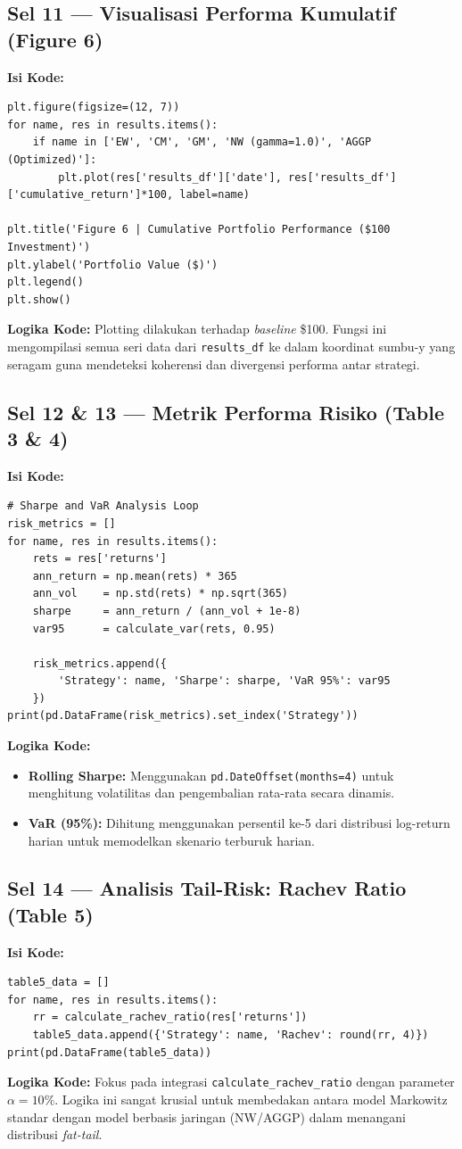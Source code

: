 \documentclass[12pt, a4paper]{article}
\begin{document}
\subsection{Sel 11 — Visualisasi Performa Kumulatif (Figure 6)}
\textbf{Isi Kode:}
\begin{lstlisting}
plt.figure(figsize=(12, 7))
for name, res in results.items():
    if name in ['EW', 'CM', 'GM', 'NW (gamma=1.0)', 'AGGP (Optimized)']:
        plt.plot(res['results_df']['date'], res['results_df']['cumulative_return']*100, label=name)

plt.title('Figure 6 | Cumulative Portfolio Performance ($100 Investment)')
plt.ylabel('Portfolio Value ($)')
plt.legend()
plt.show()
\end{lstlisting}
\textbf{Logika Kode:} Plotting dilakukan terhadap \textit{baseline} \$100. Fungsi ini mengompilasi semua seri data dari \texttt{results\_df} ke dalam koordinat sumbu-y yang seragam guna mendeteksi koherensi dan divergensi performa antar strategi.

\subsection{Sel 12 \& 13 — Metrik Performa Risiko (Table 3 \& 4)}
\textbf{Isi Kode:}
\begin{lstlisting}
# Sharpe and VaR Analysis Loop
risk_metrics = []
for name, res in results.items():
    rets = res['returns']
    ann_return = np.mean(rets) * 365
    ann_vol    = np.std(rets) * np.sqrt(365)
    sharpe     = ann_return / (ann_vol + 1e-8)
    var95      = calculate_var(rets, 0.95)
    
    risk_metrics.append({
        'Strategy': name, 'Sharpe': sharpe, 'VaR 95%': var95
    })
print(pd.DataFrame(risk_metrics).set_index('Strategy'))
\end{lstlisting}
\textbf{Logika Kode:}
\begin{itemize}
    \item \textbf{Rolling Sharpe:} Menggunakan \texttt{pd.DateOffset(months=4)} untuk menghitung volatilitas dan pengembalian rata-rata secara dinamis.
    \item \textbf{VaR (95\%):} Dihitung menggunakan persentil ke-5 dari distribusi log-return harian untuk memodelkan skenario terburuk harian.
\end{itemize}

\subsection{Sel 14 — Analisis Tail-Risk: Rachev Ratio (Table 5)}
\textbf{Isi Kode:}
\begin{lstlisting}
table5_data = []
for name, res in results.items():
    rr = calculate_rachev_ratio(res['returns'])
    table5_data.append({'Strategy': name, 'Rachev': round(rr, 4)})
print(pd.DataFrame(table5_data))
\end{lstlisting}
\textbf{Logika Kode:} Fokus pada integrasi \texttt{calculate\_rachev\_ratio} dengan parameter $\alpha=10\%$. Logika ini sangat krusial untuk membedakan antara model Markowitz standar dengan model berbasis jaringan (NW/AGGP) dalam menangani distribusi \textit{fat-tail}.
        
\end{document}
